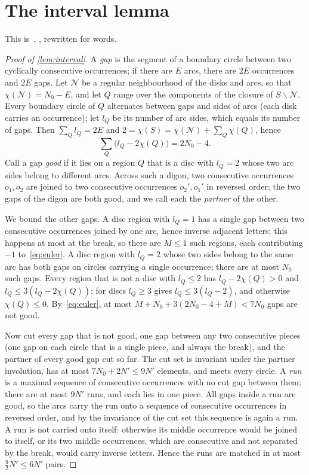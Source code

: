 \documentclass[11pt]{article}
\theoremstyle{definition}
\theoremstyle{plain}
\begin{document}
\appendix
{}
\section{The interval lemma}\label{app:interval}

This is~\cite[Lemma~4.3]{OAI196}, \cite[Lemma~5.4]{OAI197a}, rewritten for words.

\begin{proof}[Proof of \cref{lem:interval}]
A \emph{gap} is the segment of a boundary circle between two cyclically consecutive occurrences; if there are $E$ arcs, there are $2E$ occurrences and $2E$ gaps. Let $\mathcal N$ be a regular neighbourhood of the disks and arcs, so that $\chi(\mathcal N)=N_0-E$, and let $Q$ range over the components of the closure of $S\smallsetminus\mathcal N$. Every boundary circle of $Q$ alternates between gaps and sides of arcs (each disk carries an occurrence); let $l_Q$ be its number of arc sides, which equals its number of gaps. Then $\sum_Q l_Q=2E$ and $2=\chi(S)=\chi(\mathcal N)+\sum_Q\chi(Q)$, hence
\begin{equation}\label{eq:euler}
\sum_Q\big(l_Q-2\chi(Q)\big)=2N_0-4 .
\end{equation}
Call a gap \emph{good} if it lies on a region $Q$ that is a disc with $l_Q=2$ whose two arc sides belong to different arcs. Across such a digon, two consecutive occurrences $o_1,o_2$ are joined to two consecutive occurrences $o_2',o_1'$ in reversed order; the two gaps of the digon are both good, and we call each the \emph{partner} of the other.

We bound the other gaps. A disc region with $l_Q=1$ has a single gap between two consecutive occurrences joined by one arc, hence inverse adjacent letters; this happens at most at the break, so there are $M\le1$ such regions, each contributing $-1$ to~\eqref{eq:euler}. A disc region with $l_Q=2$ whose two sides belong to the same arc has both gaps on circles carrying a single occurrence; there are at most $N_0$ such gaps. Every region that is not a disc with $l_Q\le2$ has $l_Q-2\chi(Q)>0$ and $l_Q\le3(l_Q-2\chi(Q))$: for discs $l_Q\ge3$ gives $l_Q\le3(l_Q-2)$, and otherwise $\chi(Q)\le0$. By~\eqref{eq:euler}, at most $M+N_0+3(2N_0-4+M)<7N_0$ gaps are not good.

Now cut every gap that is not good, one gap between any two consecutive pieces (one gap on each circle that is a single piece, and always the break), and the partner of every good gap cut so far. The cut set is invariant under the partner involution, has at most $7N_0+2N'\le9N'$ elements, and meets every circle. A \emph{run} is a maximal sequence of consecutive occurrences with no cut gap between them; there are at most $9N'$ runs, and each lies in one piece. All gaps inside a run are good, so the arcs carry the run onto a sequence of consecutive occurrences in reversed order, and by the invariance of the cut set this sequence is again a run. A run is not carried onto itself: otherwise its middle occurrence would be joined to itself, or its two middle occurrences, which are consecutive and not separated by the break, would carry inverse letters. Hence the runs are matched in at most $\frac92N'\le6N'$ pairs.
\end{proof}
\end{document}
